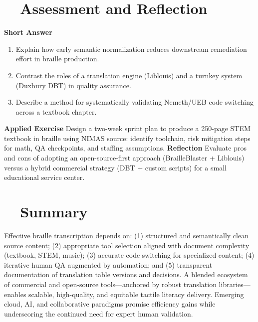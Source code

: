 \section{~~Assessment and Reflection}
\label{sec:braille-assessment}
\textbf{Short Answer}
\begin{enumerate}
	\item Explain how early semantic normalization reduces downstream remediation effort in braille production.
	\item Contrast the roles of a translation engine (Liblouis) and a turnkey system (Duxbury DBT) in quality assurance.
	\item Describe a method for systematically validating Nemeth/UEB code switching across a textbook chapter.
\end{enumerate}
\textbf{Applied Exercise} Design a two-week sprint plan to produce a 250-page STEM textbook in braille using NIMAS source: identify toolchain, risk mitigation steps for math, QA checkpoints, and staffing assumptions.
\textbf{Reflection} Evaluate pros and cons of adopting an open-source-first approach (BrailleBlaster + Liblouis) versus a hybrid commercial strategy (DBT + custom scripts) for a small educational service center.

\section{~~Summary}
\label{sec:braille-summary}
Effective braille transcription depends on: (1) structured and semantically clean source content; (2) appropriate tool selection aligned with document complexity (textbook, STEM, music); (3) accurate code switching for specialized content; (4) iterative human QA augmented by automation; and (5) transparent documentation of translation table versions and decisions. A blended ecosystem of commercial and open-source tools—anchored by robust translation libraries—enables scalable, high-quality, and equitable tactile literacy delivery. Emerging cloud, AI, and collaborative paradigms promise efficiency gains while underscoring the continued need for expert human validation.


